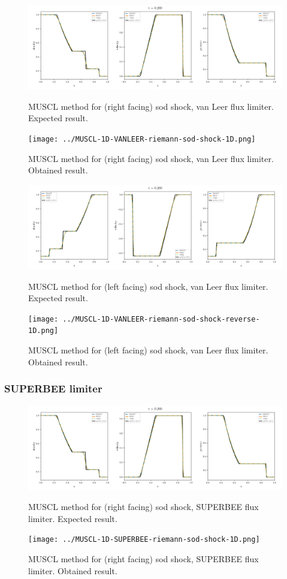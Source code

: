     \begin{figure}[htbp]
        \centering
        \includegraphics[width=.9\textwidth]{./figures/MUSCL-1D-VANLEER-riemann-sod-shock-1D.png}%
        \caption{MUSCL method for (right facing) sod shock, van Leer flux limiter. Expected result.}
        \texttt{[image: ../MUSCL-1D-VANLEER-riemann-sod-shock-1D.png]}%
        \caption{MUSCL method for (right facing) sod shock, van Leer flux limiter. Obtained result.}
    \end{figure}


    \begin{figure}[htbp]
        \centering
        \includegraphics[width=.9\textwidth]{./figures/MUSCL-1D-VANLEER-riemann-sod-shock-reverse-1D.png}%
        \caption{MUSCL method for (left facing) sod shock, van Leer flux limiter. Expected result.}
        \texttt{[image: ../MUSCL-1D-VANLEER-riemann-sod-shock-reverse-1D.png]}%
        \caption{MUSCL method for (left facing) sod shock, van Leer flux limiter. Obtained result.}
    \end{figure}








\clearpage
\subsubsection{SUPERBEE limiter}

    \begin{figure}[htbp]
        \centering
        \includegraphics[width=.9\textwidth]{./figures/MUSCL-1D-SUPERBEE-riemann-sod-shock-1D.png}%
        \caption{MUSCL method for (right facing) sod shock, SUPERBEE flux limiter. Expected result.}
        \texttt{[image: ../MUSCL-1D-SUPERBEE-riemann-sod-shock-1D.png]}%
        \caption{MUSCL method for (right facing) sod shock, SUPERBEE flux limiter. Obtained result.}
    \end{figure}


